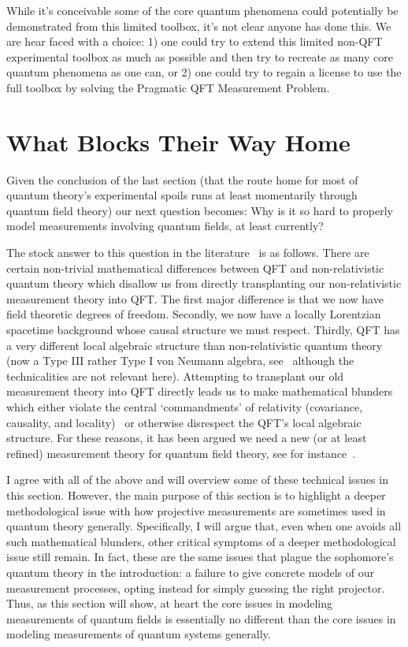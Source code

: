 \documentclass[prd,twocolumn,superscriptaddress,floatfix,amsmath,amssymb,amsfonts,nofootinbib]{revtex4-2}
\begin{document}
While it's conceivable some of the core quantum phenomena could potentially be demonstrated from this limited toolbox, it's not clear anyone has done this. We are hear faced with a choice: 1) one could try to extend this limited non-QFT experimental toolbox as much as possible and then try to recreate as many core quantum phenomena as one can, or 2) one could try to regain a license to use the full toolbox by solving the Pragmatic QFT Measurement Problem.

\section{What Blocks Their Way Home}\label{WhatBlocksTheirWay}
Given the conclusion of the last section (that the route home for most of quantum theory's experimental spoils runs at least momentarily through quantum field theory) our next question becomes: Why is it so hard to properly model measurements involving quantum fields, at least currently?

The stock answer to this question in the literature~\cite{pologomez2021detectorbased,Jubb2022,BorstenJubbKells,fewster1,fewster2,fewster3,Anastopoulos2022,Sorkin,TaleOfTwo,Ruep2021,JoseMariaEdu,Sorkin,Redhead1995,Dowker,Dowker2,borsten,alvaro,Adam} is as follows. There are certain non-trivial mathematical differences between QFT and non-relativistic quantum theory which disallow us from directly transplanting our non-relativistic measurement theory into QFT. The first major difference is that we now have field theoretic degrees of freedom. Secondly, we now have a locally Lorentzian spacetime background whose causal structure we must respect. Thirdly, QFT has a very different local algebraic structure than non-relativistic quantum theory (now a Type III rather Type I von Neumann algebra, see~\cite{sep-qt-nvd,Witten} although the technicalities are not relevant here). Attempting to transplant our old measurement theory into QFT directly leads us to make mathematical blunders which either violate the central `commandments' of relativity (covariance, causality, and locality)~\cite{Sorkin,Redhead1995,Dowker,Dowker2,borsten,alvaro,Adam} or otherwise disrespect the QFT's local algebraic structure. For these reasons, it has been argued we need a new (or at least refined) measurement theory for quantum field theory, see for instance~\cite{pologomez2021detectorbased,Jubb2022,fewster2}.

I agree with all of the above and will overview some of these technical issues in this section. However, the main purpose of this section is to highlight a deeper methodological issue with how projective measurements are sometimes used in quantum theory generally. Specifically, I will argue that, even when one avoids all such mathematical blunders, other critical symptoms of a deeper methodological issue still remain. In fact, these are the same issues that plague the sophomore's quantum theory in the introduction: a failure to give concrete models of our measurement processes, opting instead for simply guessing the right projector. Thus, as this section will show, at heart the core issues in modeling measurements of quantum fields is essentially no different than the core issues in modeling measurements of quantum systems generally. 
\end{document}
